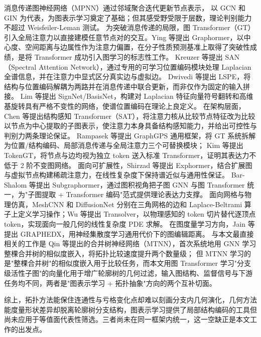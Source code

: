\documentclass[twocolumn, a4paper, 10pt]{article}
\begin{document}
消息传递图神经网络（MPNN）通过邻域聚合迭代更新节点表示，\cite{gilmer_mpnn_2017} 以 GCN\cite{kipf_gcn_2017} 和 GIN\cite{xu_gin_2019} 为代表，为图表示学习奠定了基础；但其感受野受限于层数，理论判别能力不超过 Weisfeiler-Leman 测试。\cite{xu_gin_2019} 为突破消息传递的局限，图 Transformer（GT）引入全局注意力以直接建模任意节点对的交互。Ying 等提出 Graphormer，以中心度、空间距离与边属性作为注意力偏置，在分子性质预测基准上取得了突破性成绩，是将 Transformer 成功引入图学习的标志性工作。\cite{ying_graphormer_2021} Kreuzer 等提出 SAN（Spectral Attention Network），通过专用的可学习位置编码模块处理 Laplacian 全谱信息，并在注意力中显式区分真实边与虚拟边。\cite{kreuzer_san_2021} Dwivedi 等提出 LSPE，将结构与位置编码解耦为两路并在消息传递中联合更新，而非仅作为固定的输入拼接。\cite{dwivedi_rwse_2022} Lim 等提出 SignNet/BasisNet，构建对 Laplacian 特征向量符号翻转和高维基旋转具有严格不变性的网络，使谱位置编码在理论上良定义。\cite{lim_signnet_2023} 在架构层面，Chen 等提出结构感知 Transformer（SAT），将注意力核从比较节点特征改为比较以节点为中心提取的子图表示，使注意力本身具备结构感知能力，并给出可控性与判别力两条理论保证。\cite{chen_sat_2022} Rampasek 等提出 GraphGPS 通用框架，将 GT 系统拆解为位置/结构编码、局部消息传递与全局注意力三个可替换模块；\cite{rampasek_gps_2022} Kim 等提出 TokenGT，将节点与边均视为独立 token 送入标准 Transformer，证明其表达力不低于 2 阶不变图网络。\cite{kim_tokengt_2022} 面向可扩展性，Shirzad 等提出 Exphormer，结合扩展图与虚拟节点构建稀疏注意力，在线性复杂度下保持谱近似与通用性保证。\cite{shirzad_exphormer_2023} Bar-Shalom 等提出 Subgraphormer，通过图积视角把子图 GNN 与图 Transformer 统一，为"子图提取 + Transformer 编码"范式提供理论表达力支撑。\cite{barshalom_subgraphormer_2024} 面向网格与物理仿真，MeshCNN\cite{hanocka_meshcnn_2019} 和 DiffusionNet\cite{sharp_diffusionnet_2022} 分别在三角网格的边和 Laplace-Beltrami 算子上定义学习操作；Wu 等提出 Transolver，以物理感知的 token 切片替代逐顶点 token，实现面向一般几何的线性复杂度 PDE 求解。\cite{wu_transolver_2024} 在图度量学习方向，Jain 等提出 GRAPHEDX，用神经集散度学习通用代价下的图编辑距离。\cite{jain_graphedx_2024} 与本文最直接相关的工作是 Qin 等提出的合并树神经网络（MTNN），首次系统地用 GNN 学习整棵合并树的相似度嵌入，将拓扑比较速度提升两个数量级；\cite{qin_mtnn_2024} 但 MTNN 学习的是"整棵合并树"的相似度嵌入用于比较任务，而本文用图 Transformer 学习"分支级活性子图"的向量化用于增广轮廓树的几何过滤，输入图结构、监督信号与下游任务均不同，两者是"图表示学习 + 拓扑抽象"方向的两个互补切面。

综上，拓扑方法能保住连通性与亏格变化点却难以刻画分支内几何演化，几何方法能度量形状差异却脱离轮廓树分支结构，图表示学习提供了局部结构编码的工具但尚未应用于等值面代表性筛选。三者尚未在同一框架内统一，这一空缺正是本文工作的出发点。
\end{document}
